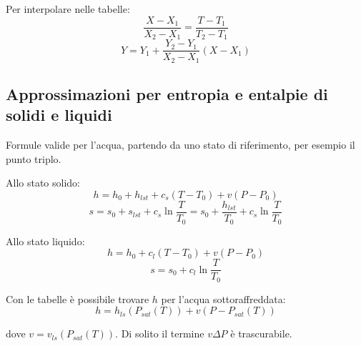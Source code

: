 Per interpolare nelle tabelle:
\[ \frac{X-X_1}{X_2-X_1} = \frac{T-T_1}{T_2-T_1} \]
\[ Y = Y_1 + \frac{Y_2-Y_1}{X_2-X_1}(X-X_1) \]

\subsection{Approssimazioni per entropia e entalpie di solidi e liquidi}

Formule valide per l'acqua, partendo da uno stato di riferimento, per esempio il punto triplo.

Allo stato solido:
\[ h = h_0 + h_{lst} + c_s(T-T_0) + v(P-P_0) \]
\[ s = s_0 + s_{lst} + c_s\ln{\frac{T}{T_0}} = s_0 + \frac{h_{lst}}{T_0} + c_s\ln{\frac{T}{T_0}} \]

Allo stato liquido:
\[ h = h_0 + c_l(T-T_0) + v(P-P_0) \]
\[ s = s_0 + c_l\ln{\frac{T}{T_0}} \]

Con le tabelle è possibile trovare $h$ per l'acqua sottoraffreddata:
\[ h = h_{ls}(P_{sat}(T)) + v(P-P_{sat}(T)) \]

dove $v = v_{ls}(P_{sat}(T))$. Di solito il termine $v\Delta P$ è trascurabile.
